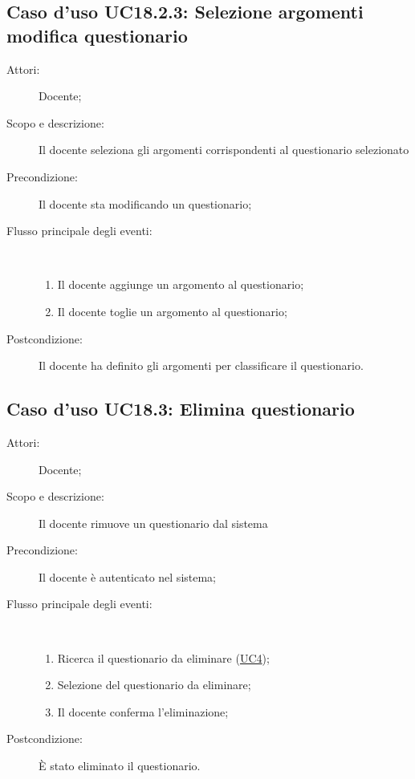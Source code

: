 \subsection{Caso d'uso UC18.2.3: Selezione argomenti modifica questionario}\begin{description}
	\item[Attori:] Docente;
	\item[Scopo e descrizione:] Il docente seleziona gli argomenti corrispondenti al questionario selezionato
	\item[Precondizione:] Il docente sta modificando un questionario;
	
	\item[Flusso principale degli eventi:] \ 
	\begin{enumerate}
		\item Il docente aggiunge un argomento al questionario;
		\item Il docente toglie un argomento al questionario;
		
	\end{enumerate}
	\item[Postcondizione:] Il docente ha definito gli argomenti per classificare il questionario.
\end{description}
\hypertarget{UC18.3}{}
\subsection{Caso d'uso UC18.3: Elimina questionario}\begin{description}
	\item[Attori:] Docente;
	\item[Scopo e descrizione:] Il docente rimuove un questionario dal sistema
	\item[Precondizione:] Il docente è autenticato nel sistema;
	
	\item[Flusso principale degli eventi:] \ 
	\begin{enumerate}
		\item Ricerca il questionario da eliminare (\hyperlink{UC4}{UC4});
		\item Selezione del questionario da eliminare;
		\item Il docente conferma l'eliminazione;
		
	\end{enumerate}
	\item[Postcondizione:] È stato eliminato il questionario.
\end{description}
\hypertarget{UC18.4}{}
